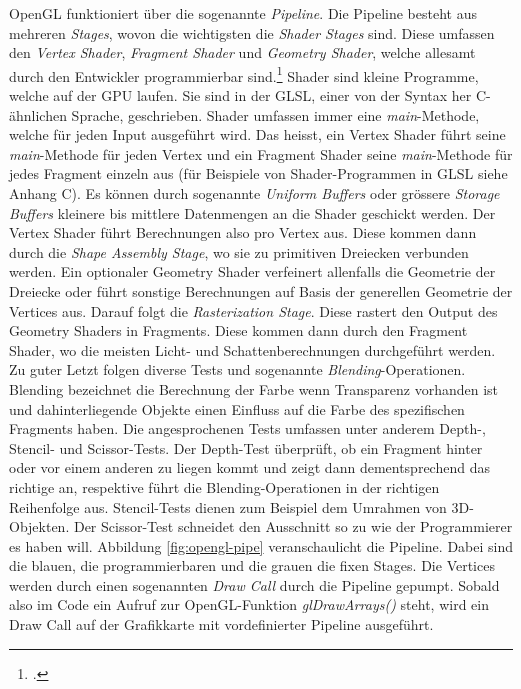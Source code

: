 \documentclass[titlepage, 11pt, a4paper, ngerman]{article}
\begin{document}
\acrshort{OpenGL} funktioniert über die sogenannte \textit{Pipeline}. Die Pipeline besteht aus mehreren \textit{Stages}, wovon die wichtigsten die \textit{\gls{Shader} Stages} sind. Diese umfassen den \textit{\gls{Vertex} \gls{Shader}}, \textit{\gls{Fragment} \gls{Shader}} und \textit{Geometry \gls{Shader}}, welche allesamt durch den Entwickler programmierbar sind.\footcite{ogl-pipeline-khronos-wiki} \gls{Shader} sind kleine Programme, welche auf der GPU laufen. Sie sind in der \acrfull{GLSL}, einer von der Syntax her C-ähnlichen Sprache, geschrieben. \gls{Shader} umfassen immer eine \textit{main}-Methode, welche für jeden Input ausgeführt wird. Das heisst, ein \gls{Vertex} \gls{Shader} führt seine \textit{main}-Methode für jeden \gls{Vertex} und ein \gls{Fragment} \gls{Shader} seine \textit{main}-Methode für jedes \gls{Fragment} einzeln aus (für Beispiele von \gls{Shader}-Programmen in \acrshort{GLSL} siehe Anhang C). Es können durch sogenannte \textit{Uniform Buffers} oder grössere \textit{Storage Buffers} kleinere bis mittlere Datenmengen an die \gls{Shader} geschickt werden. Der \gls{Vertex} \gls{Shader} führt Berechnungen also pro \gls{Vertex} aus. Diese kommen dann durch die \textit{Shape Assembly Stage}, wo sie zu primitiven Dreiecken verbunden werden. Ein optionaler Geometry \gls{Shader} verfeinert allenfalls die Geometrie der Dreiecke oder führt sonstige Berechnungen auf Basis der generellen Geometrie der \gls{Vertices} aus. Darauf folgt die \textit{Rasterization Stage}. Diese rastert den Output des Geometry \gls{Shader}s in \glspl{Fragment}. Diese kommen dann durch den \gls{Fragment} \gls{Shader}, wo die meisten Licht- und Schattenberechnungen durchgeführt werden. Zu guter Letzt folgen diverse Tests und sogenannte \textit{Blending}-Operationen. Blending bezeichnet die Berechnung der Farbe wenn Transparenz vorhanden ist und dahinterliegende Objekte einen Einfluss auf die Farbe des spezifischen \gls{Fragment}s haben. Die angesprochenen Tests umfassen unter anderem Depth-, Stencil- und Scissor-Tests. Der Depth-Test überprüft, ob ein \gls{Fragment} hinter oder vor einem anderen zu liegen kommt und zeigt dann dementsprechend das richtige an, respektive führt die Blending-Operationen in der richtigen Reihenfolge aus. Stencil-Tests dienen zum Beispiel dem Umrahmen von 3D-Objekten. Der Scissor-Test schneidet den Ausschnitt so zu wie der Programmierer es haben will. Abbildung \ref{fig:opengl-pipe} veranschaulicht die Pipeline. Dabei sind die blauen, die programmierbaren und die grauen die fixen Stages. Die \gls{Vertices} werden durch einen sogenannten \textit{Draw Call} durch die Pipeline gepumpt. Sobald also im Code ein Aufruf zur \acrshort{OpenGL}-Funktion \textit{glDrawArrays()} steht, wird ein Draw Call auf der Grafikkarte mit vordefinierter Pipeline ausgeführt. 
\end{document}
